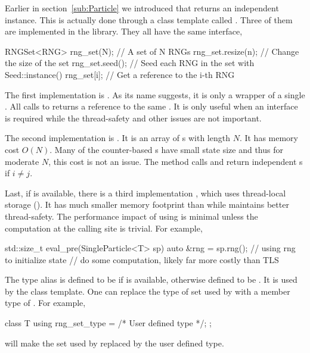 Earlier in section~\ref{sub:Particle} we introduced that
 returns an independent \rng instance. This is
actually done through a class template called . Three of them
are implemented in the library. They all have the same interface,
\begin{cppcode}
  RNGSet<RNG> rng_set(N); // A set of N RNGs
  rng_set.resize(n);      // Change the size of the set
  rng_set.seed();         // Seed each RNG in the set with Seed::instance()
  rng_set[i];             // Get a reference to the i-th RNG
\end{cppcode}
The first implementation is . As its name suggests, it
is only a wrapper of a single \rng. All calls to  returns
a reference to the same \rng. It is only useful when an 
interface is required while the thread-safety and other issues are not
important.

The second implementation is . It is an array of
\rng{}s with length $N$. It has memory cost $O(N)$. Many of the counter-based
\rng{}s have small state size and thus for moderate $N$, this cost is not an
issue. The method calls  and 
return independent \rng{}s if $i \ne j$.

Last, if \tbb is available, there is a third implementation
, which uses thread-local storage (\tls). It has much
smaller memory footprint than  while maintains better
thread-safety. The performance impact of using \tls is minimal unless the
computation at the calling site is trivial. For example,
\begin{cppcode}
  std::size_t eval_pre(SingleParticle<T> sp)
  {
      auto &rng = sp.rng();
      // using rng to initialize state
      // do some computation, likely far more costly than TLS
  }
\end{cppcode}
The type alias  is defined to be  if
\tbb is available, otherwise defined to be . It is used
by the  class template. One can replace the type of \rng
set used by  with a member type of .  For
example,
\begin{cppcode}
  class T
  {
      using rng_set_type = /* User defined type */;
  };
\end{cppcode}
will make the \rng set used by  replaced by the user
defined type.

